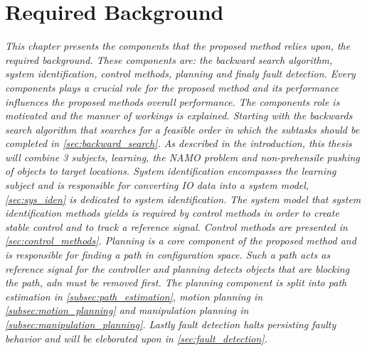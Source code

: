 \chapter{Required Background}%
\label{chap:required_background}
\textit{This chapter presents the components that the proposed method relies upon, the required background. These components are: the backward search algorithm, system identification, control methods, planning and finaly fault detection. Every components plays a crucial role for the proposed method and its performance influences the proposed methods overall performance. The components role is motivated and the manner of workings is explained. Starting with the backwards search algorithm that searches for a feasible order in which the subtasks should be completed in \cref{sec:backward_search}. As described in the introduction, this thesis will combine 3 subjects, learning, the \ac{NAMO} problem and non-prehensile pushing of objects to target locations. System identification encompasses the learning subject and is responsible for converting \ac{IO} data into a system model, \cref{sec:sys_iden} is dedicated to system identification. The system model that system identification methods yields is required by control methods in order to create stable control and to track a reference signal. Control methods are presented in \cref{sec:control_methods}. Planning is a core component of the proposed method and is responsible for finding a path in configuration space. Such a path acts as reference signal for the controller and planning detects objects that are blocking the path, adn must be removed first. The planning component is split into path estimation in \cref{subsec:path_estimation}, motion planning in \cref{subsec:motion_planning} and manipulation planning in \cref{subsec:manipulation_planning}. Lastly fault detection halts persisting faulty behavior and will be eleborated upon in \cref{sec:fault_detection}.\bs}

% 
% 
% 

% 
